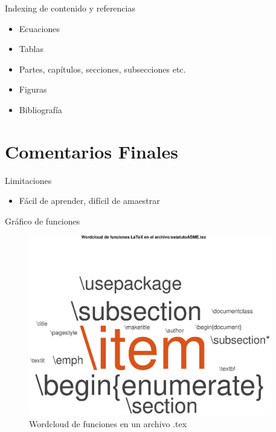 \documentclass[10pt]{beamer}
\begin{document}
\begin{frame}{Indexing de contenido y referencias}
\vspace{0cm}
\begin{itemize}
\setlength\itemsep{1em}
\item Ecuaciones

\item Tablas

\item Partes, capítulos, secciones, subsecciones etc.

\item Figuras

\item Bibliografía

\end{itemize}

\end{frame}

\section{Comentarios Finales}

\begin{frame}{Limitaciones}

\begin{itemize}
\setlength\itemsep{1em}
\item Fácil de aprender, difícil de amaestrar
\end{itemize}

\end{frame}
\begin{frame}{Gráfico de funciones} 
\vspace{.2cm}
\begin{centering}
\begin{figure}

\includegraphics[width=10.6cm]{fig/asme.eps}
\caption{Wordcloud de funciones en un archivo .tex}
\end{figure}
\end{centering}
\end{frame}
\end{document}
